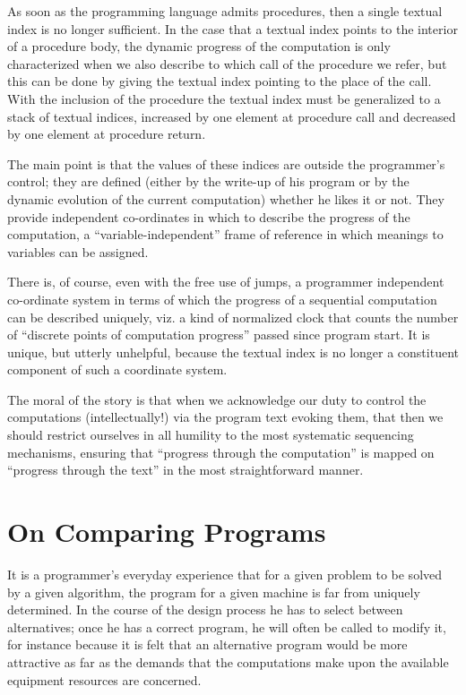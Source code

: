 As soon as the programming language admits procedures, then a single textual index is no longer sufficient. In the case that a textual index points to the interior of a procedure body, the dynamic progress of the computation is only characterized when we also describe to which call of the procedure we refer, but this can be done by giving the textual index pointing to the place of the call. With the inclusion of the procedure the textual index must be generalized to a stack of textual indices, increased by one element at procedure call and decreased by one element at procedure return.

The main point is that the values of these indices are outside the programmer's control; they are defined (either by the write-up of his program or by the dynamic evolution of the current computation) whether he likes it or not. They provide independent co-ordinates in which to describe the progress of the computation, a ``variable-independent'' frame of reference in which meanings to variables can be assigned.

There is, of course, even with the free use of jumps, a programmer independent co-ordinate system in terms of which the progress of a sequential computation can be described uniquely, viz. a kind of normalized clock that counts the number of ``discrete points of computation progress'' passed since program start. It is unique, but utterly unhelpful, because the textual index is no longer a constituent component of such a coordinate system.

The moral of the story is that when we acknowledge our duty to control the computations (intellectually!) via the program text evoking them, that then we should restrict ourselves in all humility to the most systematic sequencing mechanisms, ensuring that ``progress through the computation'' is mapped on ``progress through the text'' in the most straightforward manner.

\section[On comparing programs]{On Comparing Programs}
\label{sec:comparing-programs}

It is a programmer's everyday experience that for a given problem to be solved by a given algorithm, the program for a given machine is far from uniquely determined. In the course of the design process he has to select between alternatives; once he has a correct program, he will often be called to modify it, for instance because it is felt that an alternative program would be more attractive as far as the demands that the computations make upon the available equipment resources are concerned.

